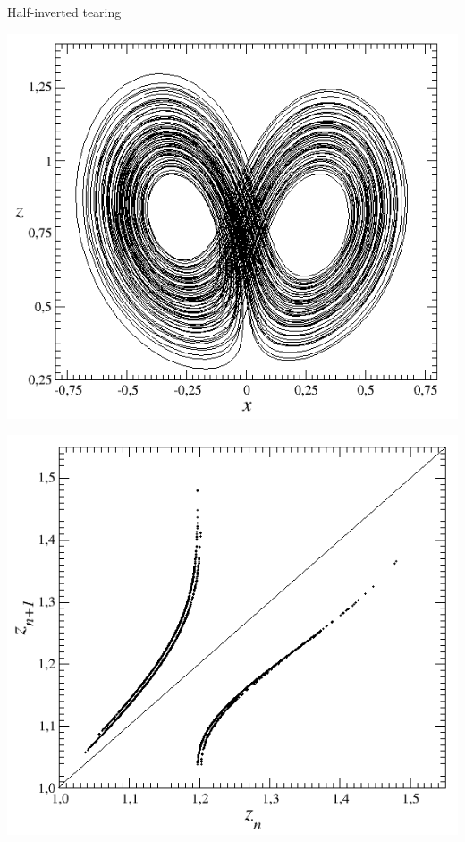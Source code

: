 \documentclass[usenames, dvipsnames, aspectratio=169]{beamer}
\begin{document}
\begin{frame}[t, c]{Half-inverted tearing}{}
    \vfill
  
  \begin{minipage}{.48\textwidth}
    \centering
    \includegraphics[width=\textwidth]{half_inverted_tearing}
  \end{minipage}%
  \hfill
  \begin{minipage}{.48\textwidth}
    \centering
    \includegraphics[width=\textwidth]{half_inverted_tearing_map}
  \end{minipage}

  \vfill

\end{frame}
\end{document}
